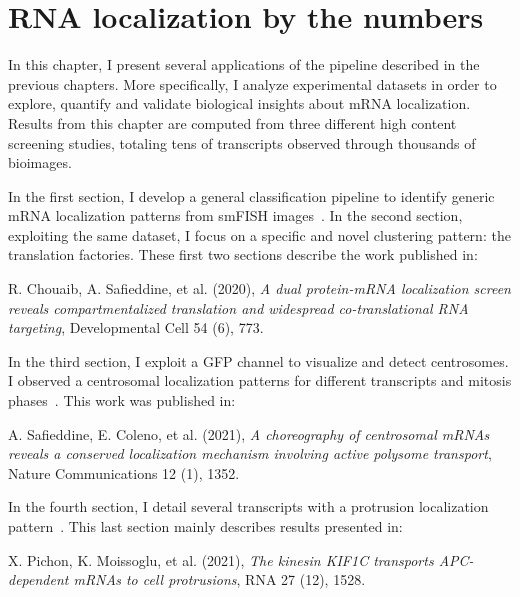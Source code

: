 
\graphicspath{{./figures/chapter5/}}

\chapter{RNA localization by the numbers}
\label{ch:chapter5}

\minitoc
\newpage

In this chapter, I present several applications of the pipeline described in the previous chapters.
More specifically, I analyze experimental datasets in order to explore, quantify and validate biological insights about \ac{mRNA} localization.
Results from this chapter are computed from three different high content screening studies, totaling tens of transcripts observed through thousands of bioimages.

In the first section, I develop a general classification pipeline to identify generic \ac{mRNA} localization patterns from \ac{smFISH} images~\cite{CHOUAIB_2020}.
In the second section, exploiting the same dataset, I focus on a specific and novel clustering pattern: the translation factories.
These first two sections describe the work published in:

\begin{center}
	\color{green}
	R. Chouaib, A. Safieddine, et al. (2020), \textit{A dual protein-mRNA localization screen reveals compartmentalized translation and widespread co-translational RNA targeting}, Developmental Cell 54 (6), 773.
\end{center}

In the third section, I exploit a \ac{GFP} channel to visualize and detect centrosomes.
I observed a centrosomal localization patterns for different transcripts and mitosis phases~\cite{safieddine_choreography_2021}.
This work was published in:

\begin{center}
	\color{green}
	A. Safieddine, E. Coleno, et al. (2021), \textit{A choreography of centrosomal mRNAs reveals a conserved localization mechanism involving active polysome transport}, Nature Communications 12 (1), 1352.
\end{center}

In the fourth section, I detail several transcripts with a protrusion localization pattern~\cite{pichon_kinesin_2021}.
This last section mainly describes results presented in:

\begin{center}
	\color{green}
	X. Pichon, K. Moissoglu, et al. (2021), \textit{The kinesin KIF1C transports APC-dependent mRNAs to cell protrusions}, RNA 27 (12), 1528.
\end{center}

